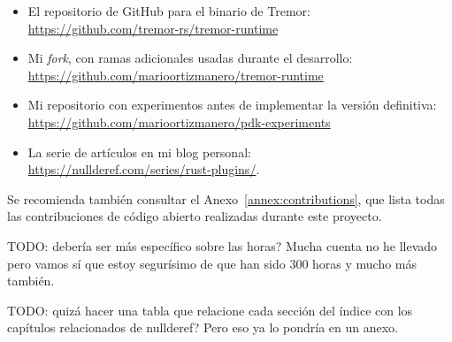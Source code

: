 \begin{itemize}
    \item El repositorio de GitHub para el binario de Tremor:\\
        \url{https://github.com/tremor-rs/tremor-runtime}
    \item Mi \emph{fork}, con ramas adicionales usadas durante el desarrollo:\\
        \url{https://github.com/marioortizmanero/tremor-runtime}
    \item Mi repositorio con experimentos antes de implementar la versión
        definitiva:\\
        \url{https://github.com/marioortizmanero/pdk-experiments}
    \item La serie de artículos en mi blog personal:\\
        \url{https://nullderef.com/series/rust-plugins/}.
\end{itemize}

Se recomienda también consultar el Anexo~\ref{annex:contributions}, que lista
todas las contribuciones de código abierto realizadas durante este proyecto.

TODO: debería ser más específico sobre las horas? Mucha cuenta no he llevado
pero vamos sí que estoy segurísimo de que han sido 300 horas y mucho más
también.

TODO: quizá hacer una tabla que relacione cada sección del índice con los
capítulos relacionados de nullderef? Pero eso ya lo pondría en un anexo.
